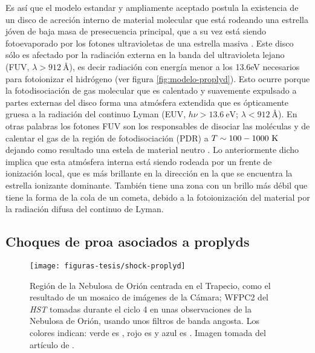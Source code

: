 Es así que el modelo estandar y ampliamente aceptado postula la existencia de un disco de acreción interno de material molecular que está rodeando una estrella jóven de baja masa de presecuencia principal, que a su vez está siendo fotoevaporado por los fotones ultravioletas de una estrella masiva \citep{Johnstone:1998, Henney:1998a}. Este disco sólo es afectado por la radiación externa en la banda del ultravioleta lejano (FUV, \(\lambda > 912~\text{\AA{}} \)), es decir radiación con energía menor a los 13.6eV necesarios para fotoionizar el hidrógeno (ver figura \ref{fig:modelo-proplyd}). Esto ocurre porque la fotodisociación de gas molecular que es calentado y suavemente expulsado a partes externas del disco forma una atmósfera extendida que es ópticamente gruesa a la radiación del continuo Lyman (EUV, \(h\nu > 13.6~\text{eV}\); \(\lambda < 912~\text{\AA{}} \)). En otras palabras los fotones FUV son los responsables de disociar las moléculas y de calentar el gas de la región de fotodisociación (PDR) a \(T\sim100-1000~\mathrm{K}\) dejando como resultado una estela de material neutro \citep{Johnstone:1998}. Lo anteriormente dicho implica que esta atmósfera interna está siendo rodeada por un frente de ionización local, que es más brillante en la dirección en la que se encuentra la estrella ionizante dominante. También tiene una zona con un brillo más débil que tiene la forma de la cola de un cometa, debido a la fotoionización del material por la radiación difusa del continuo de Lyman.\\ 

\subsection{Choques de proa asociados a proplyds}
\label{sec:shock-proply}

\begin{figure}
  \centering
   \texttt{[image: figuras-tesis/shock-proplyd]}          
  \caption{Región de la Nebulosa de Orión centrada en el Trapecio, como el resultado de un mosaico de imágenes de la Cámara; WFPC2 del \textit{HST} tomadas durante el ciclo 4 en unas observaciones de la Nebulosa de Orión, usando unos filtros de banda angosta. Los colores indican: verde es \ha{}, rojo es \nii{} y azul es \oi{}. Imagen tomada del artículo de \citet{Bally:1998a}.}
  \label{fig:shock-proplyd}
\end{figure}

